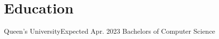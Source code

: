 \section{Education}
    \resumeSubHeadingListStart
    
    \resumeSubheading
    {Queen's University}{Expected Apr. 2023}
    {Bachelors of Computer Science}{}
    
    \resumeSubHeadingListEnd